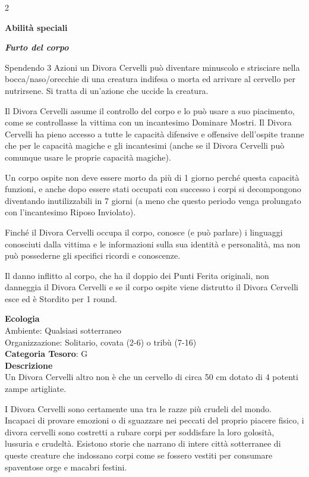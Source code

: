 \begin{multicols}{2}
{\textbf{Abilità speciali}

\emph{\textbf{Furto del corpo}}

Spendendo 3 Azioni un Divora Cervelli può diventare minuscolo e strisciare nella bocca/naso/orecchie di una creatura indifesa o morta ed arrivare al cervello per nutrirsene. Si tratta di un'azione che uccide la creatura.

Il Divora Cervelli assume il controllo del corpo e lo può usare a suo piacimento, come se controllasse la vittima con un incantesimo Dominare Mostri. Il Divora Cervelli ha pieno accesso a tutte le capacità difensive e offensive dell'ospite tranne che per le capacità magiche e gli incantesimi (anche se il Divora Cervelli può comunque usare le proprie capacità magiche).

Un corpo ospite non deve essere morto da più di 1 giorno perché questa capacità funzioni, e anche dopo essere stati occupati con successo i corpi si decompongono diventando inutilizzabili in 7 giorni (a meno che questo periodo venga prolungato con l'incantesimo Riposo Inviolato).

Finché il Divora Cervelli occupa il corpo, conosce (e può parlare) i linguaggi conosciuti dalla vittima e le informazioni sulla sua identità e personalità, ma non può possederne gli specifici ricordi e conoscenze.

Il danno inflitto al corpo, che ha il doppio dei Punti Ferita originali, non danneggia il Divora Cervelli e se il corpo ospite viene distrutto il Divora Cervelli esce ed è Stordito per 1 round.

\textbf{Ecologia}\\
Ambiente: Qualsiasi sotterraneo\\
Organizzazione: Solitario, covata (2-6) o tribù (7-16)\\
\textbf{Categoria Tesoro}: G\\
\textbf{Descrizione}\\
Un Divora Cervelli altro non è che un cervello di circa 50 cm dotato di 4 potenti zampe artigliate.

I Divora Cervelli sono certamente una tra le razze più crudeli del mondo. Incapaci di provare emozioni o di sguazzare nei peccati del proprio piacere fisico, i divora cervelli sono costretti a rubare corpi per soddisfare la loro golosità, lussuria e crudeltà. Esistono storie che narrano di intere città sotterranee di queste creature che indossano corpi come se fossero vestiti per consumare spaventose orge e macabri festini.

}
\end{multicols}
